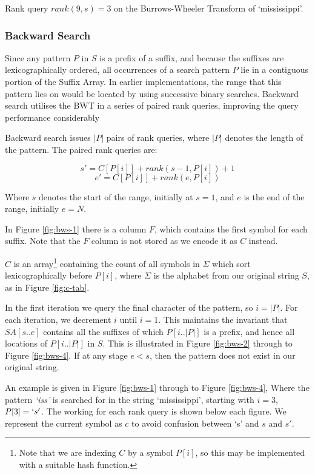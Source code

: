 			{Rank query $rank(9, s) = 3$ on the Burrows-Wheeler Transform
			of `mississippi'.}

\subsubsection{Backward Search}
Since any pattern $P$ in $S$ is a prefix of a suffix, and because the suffixes 
are lexicographically ordered, all occurrences of a search pattern $P$ lie in a 
contiguous portion of the 
Suffix Array. In earlier implementations, the range that this 
pattern lies on would be located by using successive binary searches. Backward 
search utilises the BWT 
in a series of paired rank queries, improving the query performance 
considerably ~\cite{claude2008, ferragina2009, ferragina2007, golynski2006, 
makinen2007b, makinen2007a, marin2003, navarro2006}

Backward search issues $|P|$ pairs of rank queries, where $|P|$ 
denotes the length of the pattern. The paired rank queries are:

					$$ s' = C[P[i]] + rank(s - 1, P[i]) + 1$$
					$$ e' = C[P[i]] + rank(e, P[i])$$

Where $s$ denotes the start of the range, initially at $s = 1$, and $e$ is the 
end of the range, initially $e = N$.

In Figure \ref{fig:bws-1} there is a column $F$, which contains the first 
symbol for each suffix. Note that the $F$ column is not stored as we encode it 
as $C$ instead.

$C$ is an array\footnote{Note that we are indexing $C$ by a symbol $P[i]$, so 
this may be implemented with a suitable hash function.} containing the count of 
all symbols in $\Sigma$ which sort lexicographically before $P[i]$, where 
$\Sigma$ is the alphabet from our original string $S$, as in Figure 
\ref{fig:c-tab}.

In the first iteration 
we query the final character of the pattern, so $i = |P|$.  For each 
iteration, we decrement $i$ until $i = 1$. This maintains the invariant that
$SA[s..e]$ contains all the suffixes of which $P[i..|P|]$ is a prefix, and hence
all locations of $P[i..|P|]$ in $S$. This is illustrated in Figure 
\ref{fig:bws-2} through to Figure \ref{fig:bws-4}. If at any stage $e < 
s$, then the pattern does not exist in our original string.

An example is given in Figure \ref{fig:bws-1} through to Figure \ref{fig:bws-4},
Where the pattern \emph{`iss'} is searched for in the string `mississippi',
starting with $i = 3$, $P[3] = `s'$. The working for each rank query is shown 
below each figure. We represent the current symbol as $c$ to avoid confusion 
between `s' and $s$ and $s'$.


